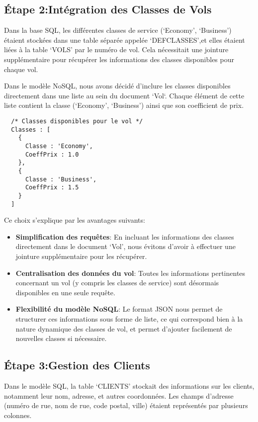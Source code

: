 \subsection{Étape 2:Intégration des Classes de Vols}

Dans la base SQL, les différentes classes de service (`Economy', `Business') étaient stockées dans une table séparée appelée `DEFCLASSES',\@ et elles étaient liées à la table `VOLS' par le numéro de vol. Cela nécessitait une jointure supplémentaire pour récupérer les informations des classes disponibles pour chaque vol.

Dans le modèle NoSQL, nous avons décidé d’inclure les classes disponibles directement dans une liste au sein du document `Vol`. Chaque élément de cette liste contient la classe (`Economy', `Business') ainsi que son coefficient de prix.

\begin{verbatim}
  /* Classes disponibles pour le vol */
  Classes : [
    {
      Classe : 'Economy',
      CoeffPrix : 1.0
    },
    {
      Classe : 'Business',
      CoeffPrix : 1.5
    }
  ]
\end{verbatim}

Ce choix s'explique par les avantages suivants:
\begin{itemize}
  \item \textbf{Simplification des requêtes}: En incluant les informations des classes directement dans le document `Vol', nous évitons d’avoir à effectuer une jointure supplémentaire pour les récupérer.
  \item \textbf{Centralisation des données du vol}: Toutes les informations pertinentes concernant un vol (y compris les classes de service) sont désormais disponibles en une seule requête.
  \item \textbf{Flexibilité du modèle NoSQL}: Le format JSON nous permet de structurer ces informations sous forme de liste, ce qui correspond bien à la nature dynamique des classes de vol, et permet d’ajouter facilement de nouvelles classes si nécessaire.
\end{itemize}

\subsection{Étape 3:Gestion des Clients}

Dans le modèle SQL, la table `CLIENTS' stockait des informations sur les clients, notamment leur nom, adresse, et autres coordonnées. Les champs d'adresse (numéro de rue, nom de rue, code postal, ville) étaient représentés par plusieurs colonnes.

